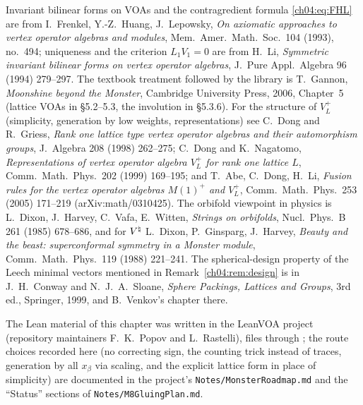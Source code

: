 Invariant bilinear forms on VOAs and the contragredient formula \eqref{ch04:eq:FHL} are from
I.~Frenkel, Y.-Z.~Huang, J.~Lepowsky, \emph{On axiomatic approaches to vertex operator algebras and
modules}, Mem.\ Amer.\ Math.\ Soc.\ 104 (1993), no.~494; uniqueness and the criterion $L_1V_1=0$ are
from H.~Li, \emph{Symmetric invariant bilinear forms on vertex operator algebras}, J.\ Pure Appl.\
Algebra 96 (1994) 279--297. The textbook treatment followed by the library is T.~Gannon,
\emph{Moonshine beyond the Monster}, Cambridge University Press, 2006, Chapter~5 (lattice VOAs in
\S5.2--5.3, the involution in \S5.3.6). For the structure of $V_L^+$ (simplicity, generation by low
weights, representations) see C.~Dong and R.~Griess, \emph{Rank one lattice type vertex operator
algebras and their automorphism groups}, J.\ Algebra 208 (1998) 262--275; C.~Dong and K.~Nagatomo,
\emph{Representations of vertex operator algebra $V_L^+$ for rank one lattice $L$}, Comm.\ Math.\
Phys.\ 202 (1999) 169--195; and T.~Abe, C.~Dong, H.~Li, \emph{Fusion rules for the vertex operator
algebras $M(1)^+$ and $V_L^+$}, Comm.\ Math.\ Phys.\ 253 (2005) 171--219 (arXiv:math/0310425). The
orbifold viewpoint in physics is L.~Dixon, J.~Harvey, C.~Vafa, E.~Witten, \emph{Strings on orbifolds},
Nucl.\ Phys.\ B 261 (1985) 678--686, and for ${V^{\natural}}$ L.~Dixon, P.~Ginsparg, J.~Harvey, \emph{Beauty
and the beast: superconformal symmetry in a Monster module}, Comm.\ Math.\ Phys.\ 119 (1988)
221--241. The spherical-design property of the Leech minimal vectors mentioned in
Remark~\ref{ch04:rem:design} is in J.~H.~Conway and N.~J.~A.~Sloane, \emph{Sphere Packings, Lattices
and Groups}, 3rd ed., Springer, 1999, and B.~Venkov's chapter there.

The Lean material of this chapter was written in the LeanVOA project (repository maintainers
F.~K.~Popov and L.~Rastelli), files  through
\leanpath{NondegLeech.lean}; the route choices recorded here (no correcting sign, the counting trick
instead of traces, generation by all $x_\beta$ via scaling, and the explicit lattice form in place of
simplicity) are documented in the project's
\texttt{Notes/MonsterRoadmap.md} and the ``Status'' sections of \texttt{Notes/M8GluingPlan.md}.
